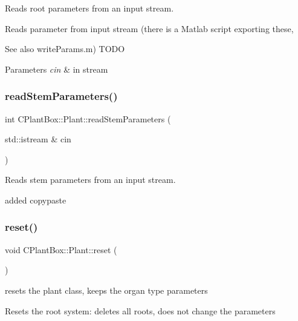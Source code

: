 Reads root parameters from an input stream. 

Reads parameter from input stream (there is a Matlab script exporting these, \begin{DoxySeeAlso}{See also}
write\+Params.\+m) T\+O\+DO
\end{DoxySeeAlso}

\begin{DoxyParams}{Parameters}
{\em cin} & in stream \\
\hline
\end{DoxyParams}
\mbox{\label{classCPlantBox_1_1Plant_ae592bd7cf3a9ef7c5140bc14b40b96a9}} 
\subsubsection{\texorpdfstring{read\+Stem\+Parameters()}{readStemParameters()}}
{\footnotesize\ttfamily int C\+Plant\+Box\+::\+Plant\+::read\+Stem\+Parameters (\begin{DoxyParamCaption}\item[{std\+::istream \&}]{cin }\end{DoxyParamCaption})}



Reads stem parameters from an input stream. 

added copypaste \mbox{\label{classCPlantBox_1_1Plant_ab0f7bf5fcd119156eb474c8909c7ac5d}} 
\subsubsection{\texorpdfstring{reset()}{reset()}}
{\footnotesize\ttfamily void C\+Plant\+Box\+::\+Plant\+::reset (\begin{DoxyParamCaption}{ }\end{DoxyParamCaption})}



resets the plant class, keeps the organ type parameters 

Resets the root system\+: deletes all roots, does not change the parameters \mbox{\label{classCPlantBox_1_1Plant_a6edbd4cd23318266a3cb40c29f7250ff}} 
